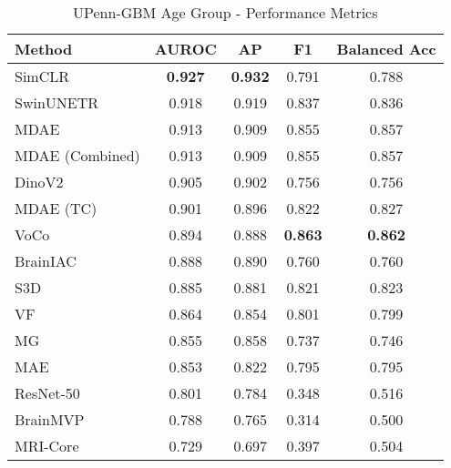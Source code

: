 \begin{table}[ht]
\centering
\caption{UPenn-GBM Age Group - Performance Metrics}
\label{tab:upenn_gbm_age_group}
\begin{tabular}{lcccc}
\toprule
Method & AUROC & AP & F1 & Balanced Acc \\
\midrule
SimCLR & \textbf{0.927} & \textbf{0.932} & 0.791 & 0.788 \\
SwinUNETR & 0.918 & 0.919 & 0.837 & 0.836 \\
MDAE & 0.913 & 0.909 & 0.855 & 0.857 \\
MDAE (Combined) & 0.913 & 0.909 & 0.855 & 0.857 \\
DinoV2 & 0.905 & 0.902 & 0.756 & 0.756 \\
MDAE (TC) & 0.901 & 0.896 & 0.822 & 0.827 \\
VoCo & 0.894 & 0.888 & \textbf{0.863} & \textbf{0.862} \\
BrainIAC & 0.888 & 0.890 & 0.760 & 0.760 \\
S3D & 0.885 & 0.881 & 0.821 & 0.823 \\
VF & 0.864 & 0.854 & 0.801 & 0.799 \\
MG & 0.855 & 0.858 & 0.737 & 0.746 \\
MAE & 0.853 & 0.822 & 0.795 & 0.795 \\
ResNet-50 & 0.801 & 0.784 & 0.348 & 0.516 \\
BrainMVP & 0.788 & 0.765 & 0.314 & 0.500 \\
MRI-Core & 0.729 & 0.697 & 0.397 & 0.504 \\
\bottomrule
\end{tabular}
\end{table}
